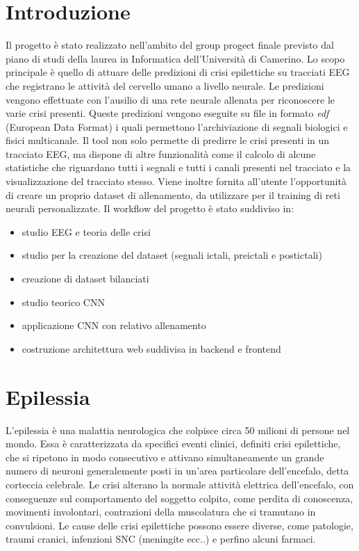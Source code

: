 \documentclass{article}
\begin{document}
\section*{Introduzione}
Il progetto è stato realizzato nell'ambito del group progect finale previsto dal piano di studi della laurea in Informatica dell'Università di Camerino.
Lo scopo principale è quello di attuare delle predizioni di crisi epilettiche su tracciati EEG che registrano le attività del cervello umano a livello neurale.
Le predizioni vengono effettuate  con l'ausilio di una rete neurale allenata per riconoscere le varie crisi presenti.
Queste predizioni vengono eseguite su file in formato \textit{edf} (European Data Format) i quali permettono l'archiviazione di segnali biologici e fisici multicanale.
Il tool non solo permette di predirre le crisi presenti in un tracciato EEG, ma dispone di altre funzionalità come il calcolo di alcune statistiche che riguardano tutti i segnali e tutti i canali presenti nel tracciato e la visualizzazione del tracciato stesso.
Viene inoltre fornita all'utente l'opportunità di creare un proprio dataset di allenamento, da utilizzare per il training di reti neurali personalizzate. 
Il workflow del progetto è stato suddiviso in:
\begin{itemize}
\item studio EEG e teoria delle crisi
\item studio per la creazione del dataset (segnali ictali, preictali e postictali)
\item creazione di dataset bilanciati
\item studio teorico CNN
\item applicazione CNN con relativo allenamento
\item costruzione architettura web suddivisa in backend e frontend 
\end{itemize}

\newpage

\section{Epilessia}
L'epilessia è una malattia neurologica che colpisce circa 50 milioni di persone nel mondo. Essa è caratterizzata da specifici eventi clinici, definiti crisi epilettiche, che si ripetono in modo consecutivo e attivano simultaneamente un grande numero di neuroni generalemente posti in un'area particolare dell'encefalo, detta corteccia celebrale. Le crisi alterano la normale attività elettrica dell'encefalo, con conseguenze sul comportamento del soggetto colpito, come perdita di conoscenza, movimenti involontari, contrazioni della muscolatura che si tramutano in convulsioni.
Le cause delle crisi epilettiche possono essere diverse, come patologie, traumi cranici, infenzioni SNC (meningite ecc..) e perfino alcuni farmaci.
\end{document}
